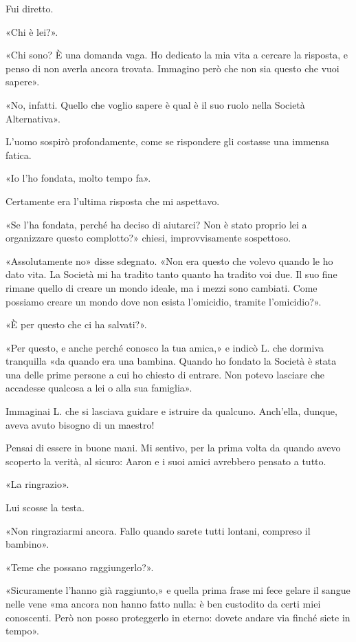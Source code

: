 \documentclass[a4paper,12pt]{book}
\begin{document}
Fui diretto.

«Chi è lei?».

«Chi sono? È una domanda vaga. Ho dedicato la mia vita a cercare la risposta,
e penso di non averla ancora trovata. Immagino però che non sia questo che vuoi
sapere».

«No, infatti. Quello che voglio sapere è qual è il suo ruolo nella Società
Alternativa».

L'uomo sospirò profondamente, come se rispondere gli costasse una immensa
fatica.

«Io l'ho fondata, molto tempo fa».

Certamente era l'ultima risposta che mi aspettavo.

«Se l'ha fondata, perché ha deciso di aiutarci? Non è stato proprio lei a
organizzare questo complotto?» chiesi, improvvisamente sospettoso.

«Assolutamente no» disse sdegnato. «Non era questo che volevo quando le ho dato
vita. La Società mi ha tradito tanto quanto ha tradito voi due. Il suo fine
rimane quello di creare un mondo ideale, ma i mezzi sono cambiati. Come possiamo
creare un mondo dove non esista l'omicidio, tramite l'omicidio?».

«È per questo che ci ha salvati?».

«Per questo, e anche perché conosco la tua amica,» e indicò L. che dormiva
tranquilla «da quando era una bambina. Quando ho fondato la Società è stata una
delle prime persone a cui ho chiesto di entrare. Non potevo lasciare che
accadesse qualcosa a lei o alla sua famiglia».

Immaginai L. che si lasciava guidare e istruire da qualcuno. Anch'ella, dunque,
aveva avuto bisogno di un maestro!

Pensai di essere in buone mani. Mi sentivo, per la prima volta da quando avevo
scoperto la verità, al sicuro: Aaron e i suoi amici avrebbero pensato a tutto.

«La ringrazio».

Lui scosse la testa.

«Non ringraziarmi ancora. Fallo quando sarete tutti lontani, compreso il
bambino».

«Teme che possano raggiungerlo?».

«Sicuramente l'hanno già raggiunto,» e quella prima frase mi fece gelare il
sangue nelle vene «ma ancora non hanno fatto nulla: è ben custodito da certi
miei conoscenti. Però non posso proteggerlo in eterno: dovete andare via finché
siete in tempo».
\end{document}
